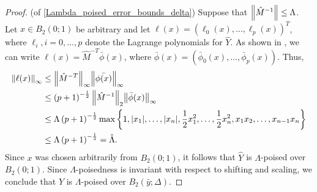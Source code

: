 \documentclass{article}
\begin{document}
%
%
%



\begin{proof}(of \cref{Lambda_poised_error_bounds_delta})
Suppose that ${\left\|\hat{M}^{-1}\right\|} \le \Lambda$.    
Let $x \in B_2(0;1)$ be arbitrary and let $\ell(x) = (\ell_0(x), \ldots, \ell_p(x))^T$, where $\ell_i, i=0,\ldots,p$ denote the Lagrange polynomials for $\hat{Y}$.
As shown in \cite{introduction_book}, we can write $\ell(x) = \hat{M}^{-T}\bar{\phi}(x)$, 
where $\bar{\phi}(x) = (\bar{\phi}_0(x), \ldots, \bar{\phi}_p(x))$.
Thus,
\begin{align*}
{\left\|\ell(x)\right\|}_{\infty} & \le {\left\|\hat{M}^{-T}\right\|}_{\infty} {\left\|\bar{\phi(x)}\right\|}_{\infty} \\
& \le \left(p+1\right)^{-\frac 1 2} {\left\|\hat{M}^{-1}\right\|}_2 {\left\|\bar{\phi}(x)\right\|}_{\infty} \\
& \le \Lambda \left(p+1\right)^{-\frac 1 2} \max\left\{1, |x_1|, \ldots,|x_n|, \frac 1 2 x_1^2, \ldots, \frac 1 2 x_n^2, x_1x_2, \ldots, x_{n-1}x_n\right\}\\
& \le \Lambda \left(p+1\right)^{-\frac 1 2}   = \hat{\Lambda}.
\end{align*}
Since $x$ was chosen arbitrarily from $B_2(0;1)$, it follows that $\hat{Y}$ is $\Lambda$-poised over $B_2(0;1)$.   Since $\Lambda$-poisedness is invariant with respect to shifting and scaling,  we conclude that $Y$ is $\Lambda$-poised over $B_2(\bar{y};\Delta)$.


\end{proof}
\end{document}
